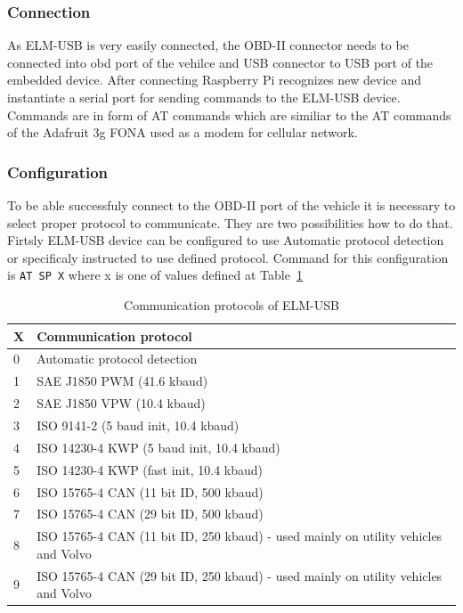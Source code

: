 \subsubsection{Connection} %
\label{ssub:connection}
As ELM-USB is very easily connected, the OBD-II connector needs to be connected into \gls{obd} port of the vehilce and USB connector to USB port of the embedded device. After connecting Raspberry Pi recognizes new device and instantiate a serial port for sending commands to the ELM-USB device. Commands are in form of AT commands which are similiar to the AT commands of the Adafruit 3g FONA used as a modem for cellular network.
\subsubsection{Configuration} %
\label{ssub:configuration}
To be able successfuly connect to the OBD-II port of the vehicle it is necessary to select proper protocol to communicate. They are two possibilities how to do that. Firtsly ELM-USB device can be configured to use Automatic protocol detection or specificaly instructed to use defined protocol. Command for this configuration is \verb|AT SP X|\cite{at_cmd} where x is one of values defined at Table~\ref{tab:tab3}
\begin{table}[H]
 \begin{center}
   \begin{tabular}{l l}
   X & Communication protocol\\
   \hline
	0 & Automatic protocol detection \\
	1 & SAE J1850 PWM (41.6 kbaud) \\
	2 & SAE J1850 VPW (10.4 kbaud) \\
	3 & ISO 9141-2 (5 baud init, 10.4 kbaud) \\
	4 & ISO 14230-4 KWP (5 baud init, 10.4 kbaud) \\
	5 & ISO 14230-4 KWP (fast init, 10.4 kbaud) \\
	6 & ISO 15765-4 CAN (11 bit ID, 500 kbaud) \\
	7 & ISO 15765-4 CAN (29 bit ID, 500 kbaud) \\
	8 & ISO 15765-4 CAN (11 bit ID, 250 kbaud) - used mainly on utility vehicles and Volvo \\
	9 & ISO 15765-4 CAN (29 bit ID, 250 kbaud) - used mainly on utility vehicles and Volvo \\
   \hline
   \end{tabular}
 \end{center}
 \caption{Communication protocols of ELM-USB}
 \label{tab:tab3}
\end{table}
